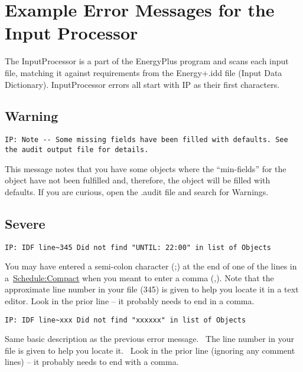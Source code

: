 \section{Example Error Messages for the Input Processor}\label{example-error-messages-for-the-input-processor}

The InputProcessor is a part of the EnergyPlus program and scans each input file, matching it against requirements from the Energy+.idd file (Input Data Dictionary). InputProcessor errors all start with IP as their first characters.

\subsection{Warning}\label{warning-001}

\begin{lstlisting}
IP: Note -- Some missing fields have been filled with defaults. See the audit output file for details.
\end{lstlisting}

This message notes that you have some objects where the ``min-fields'' for the object have not been fulfilled and, therefore, the object will be filled with defaults. If you are curious, open the .audit file and search for Warnings.

\subsection{Severe}\label{severe-001}

\begin{lstlisting}
IP: IDF line~345 Did not find "UNTIL: 22:00" in list of Objects
\end{lstlisting}

You may have entered a semi-colon character (;) at the end of one of the lines in a~\href{http://www.designbuilder.co.uk/programhelp/schedules_-_energyplus_compact_schedules.htm}{Schedule:Compact} when you meant to enter a comma (,). Note that the approximate line number in your file (345) is given to help you locate it in a text editor. Look in the prior line -- it probably needs to end in a comma.

\begin{lstlisting}
IP: IDF line~xxx Did not find "xxxxxx" in list of Objects
\end{lstlisting}

Same basic description as the previous error message.~ The line number in your file is given to help you locate it.~ Look in the prior line (ignoring any comment lines) -- it probably needs to end with a comma.

